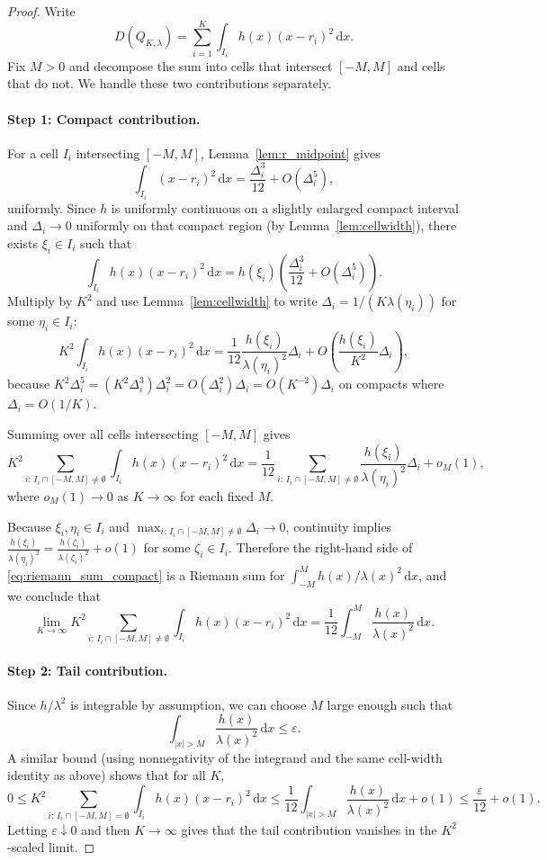 \documentclass{article}
\newcommand{\abs}[1]{\left\lvert #1 \right\rvert}
\newcommand{\dd}{\,\mathrm{d}}
\begin{document}
\begin{proof}
Write
\[
D(Q_{K,\lambda})=\sum_{i=1}^K \int_{I_i} h(x)(x-r_i)^2\dd x.
\]
Fix $M>0$ and decompose the sum into cells that intersect $[-M,M]$ and cells that do not. We handle these two contributions separately.

\paragraph*{Step 1: Compact contribution.}
For a cell $I_i$ intersecting $[-M,M]$, Lemma~\ref{lem:r_midpoint} gives
\[
\int_{I_i} (x-r_i)^2\dd x = \frac{\Delta_i^3}{12}+O(\Delta_i^5),
\]
uniformly. Since $h$ is uniformly continuous on a slightly enlarged compact interval and $\Delta_i\to 0$ uniformly on that compact region (by Lemma~\ref{lem:cellwidth}), there exists $\xi_i\in I_i$ such that
\[
\int_{I_i} h(x)(x-r_i)^2\dd x = h(\xi_i)\left(\frac{\Delta_i^3}{12}+O(\Delta_i^5)\right).
\]
Multiply by $K^2$ and use Lemma~\ref{lem:cellwidth} to write $\Delta_i = 1/(K\lambda(\eta_i))$ for some $\eta_i\in I_i$:
\[
K^2\int_{I_i} h(x)(x-r_i)^2\dd x
= \frac{1}{12}\frac{h(\xi_i)}{\lambda(\eta_i)^2}\Delta_i + O\!\left(\frac{h(\xi_i)}{K^2}\Delta_i\right),
\]
because $K^2\Delta_i^5 = (K^2\Delta_i^3)\Delta_i^2 = O(\Delta_i^2)\Delta_i = O(K^{-2})\Delta_i$ on compacts where $\Delta_i=O(1/K)$.

Summing over all cells intersecting $[-M,M]$ gives
\begin{equation}\label{eq:riemann_sum_compact}
K^2\sum_{i:\,I_i\cap[-M,M]\neq\emptyset}\int_{I_i} h(x)(x-r_i)^2\dd x
= \frac{1}{12}\sum_{i:\,I_i\cap[-M,M]\neq\emptyset}\frac{h(\xi_i)}{\lambda(\eta_i)^2}\Delta_i + o_M(1),
\end{equation}
where $o_M(1)\to 0$ as $K\to\infty$ for each fixed $M$.

Because $\xi_i,\eta_i\in I_i$ and $\max_{i:\,I_i\cap[-M,M]\neq\emptyset}\Delta_i\to 0$, continuity implies $\frac{h(\xi_i)}{\lambda(\eta_i)^2} = \frac{h(\zeta_i)}{\lambda(\zeta_i)^2}+o(1)$ for some $\zeta_i\in I_i$. Therefore the right-hand side of \eqref{eq:riemann_sum_compact} is a Riemann sum for $\int_{-M}^{M} h(x)/\lambda(x)^2\dd x$, and we conclude that
\[
\lim_{K\to\infty}
K^2\sum_{i:\,I_i\cap[-M,M]\neq\emptyset}\int_{I_i} h(x)(x-r_i)^2\dd x
= \frac{1}{12}\int_{-M}^{M}\frac{h(x)}{\lambda(x)^2}\dd x.
\]

\paragraph*{Step 2: Tail contribution.}
Since $h/\lambda^2$ is integrable by assumption, we can choose $M$ large enough such that
\[
\int_{\abs{x}>M}\frac{h(x)}{\lambda(x)^2}\dd x \le \varepsilon.
\]
A similar bound (using nonnegativity of the integrand and the same cell-width identity as above) shows that for all $K$,
\[
0\le
K^2\sum_{i:\,I_i\cap[-M,M]=\emptyset}\int_{I_i} h(x)(x-r_i)^2\dd x
\le \frac{1}{12}\int_{\abs{x}>M}\frac{h(x)}{\lambda(x)^2}\dd x + o(1)
\le \frac{\varepsilon}{12}+o(1).
\]
Letting $\varepsilon\downarrow 0$ and then $K\to\infty$  gives that the tail contribution vanishes in the $K^2$-scaled limit.


\end{proof}
\end{document}
